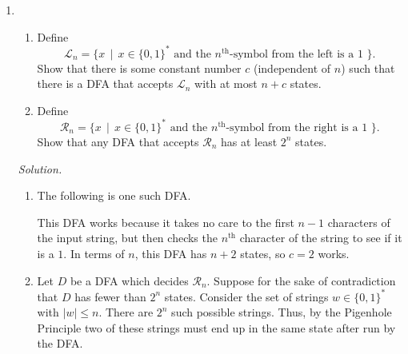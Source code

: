 \documentclass[11pt]{article}
\newcounter{enum}
\newcommand{\solution}
{
\vspace{5pt}
\noindent\textit{Solution.}\qquad
}
\begin{document}
\begin{enumerate}
\item

\begin{enumerate}

\item Define \[\mathcal{L}_n=\{x\,\mid\, x\in\{0,1\}^*\text{ and the }n^{\text{th}}\text{-symbol from the left is a 1 }\}.\]  Show that there is some constant number $c$ (independent of $n$) such that there is a DFA that accepts $\mathcal{L}_n$ with at most $n+c$ states.

\item Define \[\mathcal{R}_n=\{x\,\mid\, x\in\{0,1\}^*\text{ and the }n^{\text{th}}\text{-symbol from the right is a 1 }\}.\]  Show that any DFA that accepts $\mathcal{R}_n$ has at least $2^n$ states.

\end{enumerate}

\solution

\begin{enumerate}

\item The following is one such DFA.

\begin{center}
\end{center}

This DFA works because it takes no care to the first $n-1$ characters of the input string, but then checks the $n^{\text{th}}$ character of the string to see if it is a $1$.  In terms of $n$, this DFA has $n+2$ states, so $c=2$ works.

\item Let $D$ be a DFA which decides $\mathcal{R}_n$.  Suppose for the sake of contradiction that $D$ has fewer than $2^n$ states.  Consider the set of strings $w\in\{0,1\}^*$ with $|w|\leq n$.  There are $2^n$ such possible strings.  Thus, by the Pigenhole Principle two of these strings must end up in the same state after run by the DFA.


\end{enumerate}
\end{enumerate}
\end{document}

